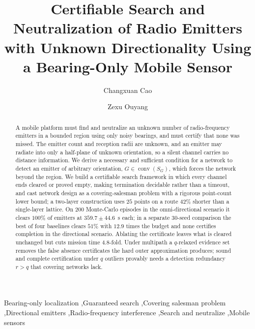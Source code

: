\documentclass[preprint,12pt,3p]{elsarticle}
\theoremstyle{definition}
\newcommand{\conv}{\operatorname{conv}}
\begin{document}
\begin{frontmatter}

\title{Certifiable Search and Neutralization of Radio Emitters with Unknown
Directionality Using a Bearing-Only Mobile Sensor}

\author[a]{Changxuan Cao}
\author[a]{Zexu Ouyang}
\address[a]{East China University of Technology, Nanchang, Jiangxi 330013, China}

\begin{abstract}
A mobile platform must find and neutralize an unknown number of radio-frequency emitters in a
bounded region using only noisy bearings, and must certify that none was missed. The emitter count
and reception radii are unknown, and an emitter may radiate into only a half-plane of unknown
orientation, so a silent channel carries no distance information. We derive a necessary and
sufficient condition for a network to detect an emitter of arbitrary orientation,
$G\in\conv(S_G)$, which forces the network beyond the region. We build a certifiable search
framework in which every channel ends cleared or proved empty, making termination decidable rather
than a timeout, and cast network design as a covering-salesman problem with a rigorous point-count
lower bound; a two-layer construction uses $25$ points on a route $42\%$ shorter than a
single-layer lattice. On $200$ Monte-Carlo episodes in the omni-directional scenario it
clears $100\%$ of emitters at
$359.7\pm44.6$~s each; in a separate $30$-seed comparison the best of four baselines clears $51\%$
with $12.9$ times the budget and none certifies completion in the directional scenario. Ablating
the certificate leaves what is cleared unchanged but cuts mission time $4.8$-fold. Under multipath
a $q$-relaxed evidence set removes the false absence certificates the hard outer approximation
produces; sound and complete certification under $q$ outliers provably needs a detection redundancy
$r>q$ that covering networks lack.
\end{abstract}


\begin{keyword}
Bearing-only localization \sep Guaranteed search \sep Covering salesman problem \sep Directional emitters \sep Radio-frequency interference \sep Search and neutralize \sep Mobile sensors
\end{keyword}

\end{frontmatter}
\end{document}
